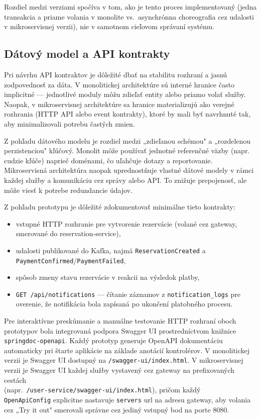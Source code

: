 Rozdiel medzi verziami spočíva v tom, ako je tento proces implementovaný (jedna transakcia a priame volania v monolite vs.\ asynchrónna choreografia cez udalosti v mikroservisnej verzii), nie v samotnom cieľovom správaní systému.

\subsection{Dátový model a API kontrakty}

Pri návrhu API kontraktov je dôležité dbať na stabilitu rozhraní a jasnú zodpovednosť za dáta. V monolitickej architektúre sú interné hranice často implicitné — jednotlivé moduly môžu zdieľať entity alebo priamo volať služby. Naopak, v mikroservisnej architektúre sa hranice materializujú ako verejné rozhrania (HTTP API alebo event kontrakty), ktoré by mali byť navrhnuté tak, aby minimalizovali potrebu častých zmien.

Z pohľadu dátového modelu je rozdiel medzi „zdieľanou schémou" a „rozdelenou perzistenciou" kľúčový. Monolit môže používať jednotné referenčné väzby (napr. cudzie kľúče) naprieč doménami, čo uľahčuje dotazy a reportovanie. Mikroservisná architektúra naopak uprednostňuje vlastné dátové modely v rámci každej služby a komunikáciu cez správy alebo API. To znižuje prepojenosť, ale môže viesť k potrebe redundancie údajov.

Z pohľadu prototypu je dôležité zdokumentovať minimálne tieto kontrakty:
\begin{itemize}
    \item vstupné HTTP rozhranie pre vytvorenie rezervácie (volané cez gateway, smerované do reservation-service),
    \item udalosti publikované do Kafka, najmä \texttt{Reservation\allowbreak Created} a \texttt{Payment\allowbreak Confirmed}/\texttt{Payment\allowbreak Failed},
    \item spôsob zmeny stavu rezervácie v reakcii na výsledok platby,
    \item \texttt{GET /api/notifications} — čítanie záznamov z \texttt{notification\_logs} pre overenie, že notifikácia bola zapísaná po ukončení platobného procesu.
\end{itemize}

Pre interaktívne preskúmanie a manuálne testovanie HTTP rozhraní oboch prototypov bola integrovaná podpora Swagger UI prostredníctvom knižnice \\ \texttt{springdoc\allowbreak-openapi}. Každý prototyp generuje OpenAPI dokumentáciu automaticky pri štarte aplikácie na základe anotácií kontrolérov. V monolitickej verzii je Swagger UI dostupný na \texttt{/swagger-ui/index.html}. V mikroservisnej verzii je Swagger UI každej služby vystavený cez gateway na prefixovaných cestách \\ (napr.\ \texttt{/user-service/swagger-ui/index.html}), pričom každý \\ \texttt{OpenApiConfig} explicitne nastavuje \texttt{servers} \gls{url} na adresu gateway, aby volania cez „Try it out" smerovali správne cez jediný vstupný bod na porte 8080.

